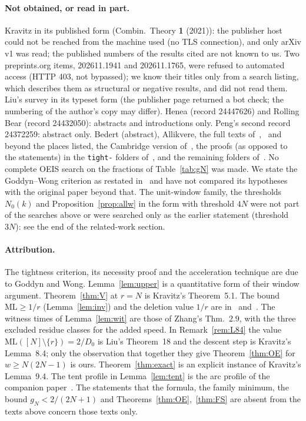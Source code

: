 \documentclass[11pt]{article}
\theoremstyle{definition}
\theoremstyle{remark}
\newcommand{\ML}{\mathrm{ML}}
\begin{document}
\paragraph{Not obtained, or read in part.}
Kravitz in its published form (Combin.\ Theory \textbf{1} (2021)): the publisher host could not be reached from the machine used (no TLS connection), and only arXiv v1 was read; the published numbers of the results cited are not known to us. Two preprints.org items, 202611.1941 and 202611.1765, were refused to automated access (HTTP 403, not bypassed); we know their titles only from a search listing, which describes them as structural or negative results, and did not read them. Liu's survey in its typeset form (the publisher page returned a bot check; the numbering of the author's copy may differ). Henea (record 24447626) and Rolling Bear (record 24432050): abstracts and introductions only. Peng's second record 24372259: abstract only. Bedert (abstract), Allikvere, the full texts of~\cite{YGB},~\cite{FS} and~\cite{C} beyond the places listed, the Cambridge version of~\cite{GK}, the proofs (as opposed to the statements) in the \texttt{tight-} folders of~\cite{R1337}, and the remaining folders of~\cite{R1337}. No complete OEIS search on the fractions of Table~\ref{tab:gN} was made. We state the Goddyn--Wong criterion as restated in~\cite[Thm.~1.1]{Z} and have not compared its hypotheses with the original paper beyond that. The unit-window family, the thresholds $N_0(k)$ and Proposition~\ref{prop:allw} in the form with threshold $4N$ were not part of the searches above or were searched only as the earlier statement (threshold $3N$): see the end of the related-work section.

\paragraph{Attribution.}
The tightness criterion, its necessity proof and the acceleration technique are due to Goddyn and Wong. Lemma~\ref{lem:upper} is a quantitative form of their window argument. Theorem~\ref{thm:V} at $r=N$ is Kravitz's Theorem~5.1. The bound $\ML\ge1/r$ (Lemma~\ref{lem:inv}) and the deletion value $1/r$ are in~\cite{Z} and~\cite{R1337}. The witness times of Lemma~\ref{lem:wit} are those of Zhang's Thm.~2.9, with the three excluded residue classes for the added speed. In Remark~\ref{rem:L84} the value $\ML([N]\setminus\{r\})=2/D_0$ is Liu's Theorem~18 and the descent step is Kravitz's Lemma~8.4; only the observation that together they give Theorem~\ref{thm:OE} for $w\ge N(2N-1)$ is ours. Theorem~\ref{thm:exact} is an explicit instance of Kravitz's Lemma~9.4. The tent profile in Lemma~\ref{lem:tent} is the arc profile of the companion paper~\cite{A2}. The statements that the formula, the family minimum, the bound $g_N<2/(2N+1)$ and Theorems~\ref{thm:OE},~\ref{thm:FS} are absent from the texts above concern those texts only.
\end{document}
